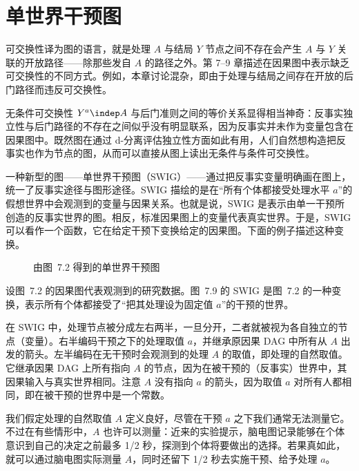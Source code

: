 \section{单世界干预图}

可交换性译为图的语言，就是处理 $A$ 与结局 $Y$ 节点之间不存在会产生 $A$ 与 $Y$ 关联的开放路径——除那些发自 $A$ 的路径之外。第 7–9 章描述在因果图中表示缺乏可交换性的不同方式。例如，本章讨论混杂，即由于处理与结局之间存在开放的后门路径而违反可交换性。

无条件可交换性 $Y^{a}\indep A$ 与后门准则之间的等价关系显得相当神奇：反事实独立性与后门路径的不存在之间似乎没有明显联系，因为反事实并未作为变量包含在因果图中。既然图在通过 d-分离评估独立性方面如此有用，人们自然想构造把反事实也作为节点的图，从而可以直接从图上读出无条件与条件可交换性。

一种新型的图——单世界干预图（SWIG）——通过把反事实变量明确画在图上，统一了反事实途径与图形途径。SWIG 描绘的是在“所有个体都接受处理水平 $a$”的假想世界中会观测到的变量与因果关系。也就是说，SWIG 是表示由单一干预所创造的反事实世界的图。相反，标准因果图上的变量代表真实世界。于是，SWIG 可以看作一个函数，它在给定干预下变换给定的因果图。下面的例子描述这种变换。

\begin{figure}[htbp]
\centering
{}
\caption{由图~7.2 得到的单世界干预图}
\label{fig:7.9}
\end{figure}

设图~7.2 的因果图代表观测到的研究数据。图~7.9 的 SWIG 是图~7.2 的一种变换，表示所有个体都接受了“把其处理设为固定值 $a$”的干预的世界。

在 SWIG 中，处理节点被分成左右两半，一旦分开，二者就被视为各自独立的节点（变量）。右半编码干预之下的处理取值 $a$，并继承原因果 DAG 中所有从 $A$ 出发的箭头。左半编码在无干预时会观测到的处理 $A$ 的取值，即处理的自然取值。它继承因果 DAG 上所有指向 $A$ 的节点，因为在被干预的（反事实）世界中，其因果输入与真实世界相同。注意 $A$ 没有指向 $a$ 的箭头，因为取值 $a$ 对所有人都相同，即在被干预的世界中是一个常数。

我们假定处理的自然取值 $A$ 定义良好，尽管在干预 $a$ 之下我们通常无法测量它。不过在有些情形中，$A$ 也许可以测量：近来的实验提示，脑电图记录能够在个体意识到自己的决定之前最多 1/2 秒，探测到个体将要做出的选择。若果真如此，就可以通过脑电图实际测量 $A$，同时还留下 1/2 秒去实施干预、给予处理 $a$。

